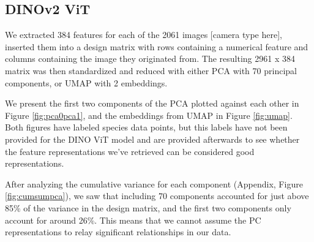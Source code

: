 

%
%
\subsection{DINOv2 ViT}
We extracted 384 features for each of the 2061 images [camera type here], inserted them into a design matrix with rows containing a numerical feature and columns containing the image they originated from. The resulting 2961 x 384 matrix was then standardized and reduced with either PCA with 70 principal components, or UMAP with 2 embeddings. 

We present the first two components of the PCA plotted against each other in Figure \ref{fig:pca0pca1}, and the embeddings from UMAP in Figure \ref{fig:umap}. Both figures have labeled species data points, but this labels have not been provided for the DINO ViT model and are provided afterwards to see whether the feature representations we've retrieved can be considered good representations.

After analyzing the cumulative variance for each component (Appendix, Figure \ref{fig:cumsumpca}), we saw that including 70 components accounted for just above 85\% of the variance in the design matrix, and the first two components only account for around 26\%. This means that we cannot assume the PC representations to relay significant relationships in our data. 

